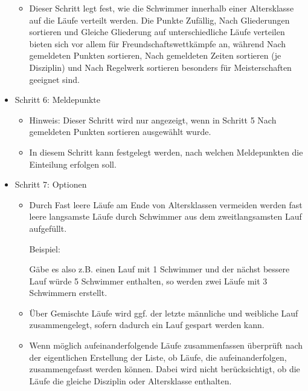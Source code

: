\documentclass[11pt,a4paper,twoside,ngerman]{article}
\begin{document}
\begin{itemize}
\begin{itemize}
\item Dieser Schritt legt fest, wie die Schwimmer innerhalb einer Altersklasse auf die Läufe verteilt werden. Die Punkte \glqq{}Zufällig\grqq{}, \glqq{}Nach Gliederungen sortieren\grqq{} und \glqq{}Gleiche Gliederung auf unterschiedliche Läufe verteilen\grqq{} bieten sich vor allem für Freundschaftswettkämpfe an, während \glqq{}Nach gemeldeten Punkten sortieren\grqq{}, \glqq{}Nach gemeldeten Zeiten sortieren (je Disziplin)\grqq{} und \glqq{}Nach Regelwerk sortieren\grqq{} besonders für Meisterschaften geeignet sind.


\end{itemize}



\item Schritt 6: Meldepunkte
\begin{itemize}

\item Hinweis: Dieser Schritt wird nur angezeigt, wenn in Schritt 5 \glqq{}Nach gemeldeten Punkten sortieren\grqq{} ausgewählt wurde.


\item In diesem Schritt kann festgelegt werden, nach welchen Meldepunkten die Einteilung erfolgen soll.


\end{itemize}



\item Schritt 7: Optionen
\begin{itemize}

\item Durch \glqq{}Fast leere Läufe am Ende von Altersklassen vermeiden\grqq{} werden fast leere \glqq{}langsamste\grqq{} Läufe durch Schwimmer aus dem \glqq{}zweitlangsamsten\grqq{} Lauf aufgefüllt. \begin{bfseries}Beispiel:\end{bfseries} Gäbe es also z.B. einen Lauf mit 1 Schwimmer und der nächst bessere Lauf würde 5 Schwimmer enthalten, so werden zwei Läufe mit 3 Schwimmern erstellt.


\item Über \glqq{}Gemischte Läufe\grqq{} wird ggf. der letzte männliche und weibliche Lauf zusammengelegt, sofern dadurch ein Lauf gespart werden kann.


\item \glqq{}Wenn möglich aufeinanderfolgende Läufe zusammenfassen\grqq{} überprüft nach der eigentlichen Erstellung der Liste, ob Läufe, die aufeinanderfolgen, zusammengefasst werden können. Dabei wird nicht berücksichtigt, ob die Läufe die gleiche Disziplin oder Altersklasse enthalten.



\end{itemize}
\end{itemize}
\end{document}
